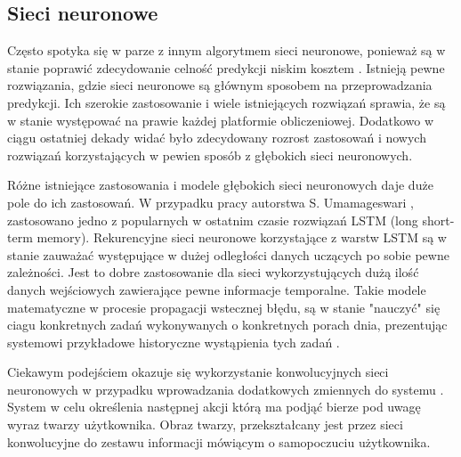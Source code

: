 

\subsection{Sieci neuronowe}


Często spotyka się w parze z innym algorytmem sieci neuronowe, ponieważ są w stanie poprawić zdecydowanie celność predykcji niskim kosztem \cite{episode_discovery_1}. Istnieją pewne rozwiązania, gdzie sieci neuronowe są głównym sposobem na przeprowadzania predykcji. Ich szerokie zastosowanie i wiele istniejących rozwiązań sprawia, że są w stanie występować na prawie każdej platformie obliczeniowej. Dodatkowo w ciągu ostatniej dekady widać było zdecydowany rozrost zastosowań i nowych rozwiązań korzystających w pewien sposób z głębokich sieci neuronowych.

Różne istniejące zastosowania i modele głębokich sieci neuronowych daje duże pole do ich zastosowań. W przypadku pracy autorstwa S. Umamageswari \cite{neural_1}, zastosowano jedno z popularnych w ostatnim czasie rozwiązań LSTM (long short-term memory). Rekurencyjne sieci neuronowe korzystające z warstw LSTM są w stanie zauważać występujące w dużej odległości danych uczących po sobie pewne zależności. Jest to dobre zastosowanie dla sieci wykorzystujących dużą ilość danych wejściowych zawierające pewne informacje temporalne. Takie modele matematyczne w procesie propagacji wstecznej błędu, są w stanie "nauczyć" się ciagu konkretnych zadań wykonywanych o konkretnych porach dnia, prezentując systemowi przykładowe historyczne wystąpienia tych zadań \cite{ksiazka_tf}.

Ciekawym podejściem okazuje się wykorzystanie konwolucyjnych sieci neuronowych w przypadku wprowadzania dodatkowych zmiennych do systemu \cite{conv_1}. System w celu określenia następnej akcji którą ma podjąć bierze pod uwagę wyraz twarzy użytkownika. Obraz twarzy, przekształcany jest przez sieci konwolucyjne do zestawu informacji mówiącym o samopoczuciu użytkownika.

